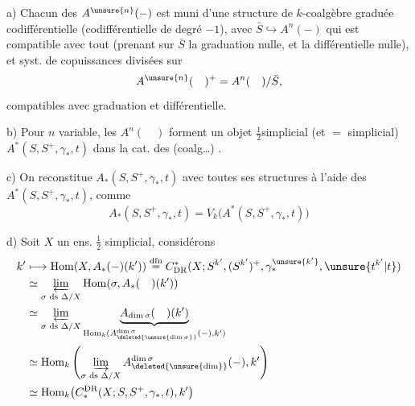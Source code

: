 a) Chacun des $A^{\unsure{n}}(-)$ est muni d'une structure de $k$-coalgèbre  graduée codifférentielle (codifférentielle de degré $-1$), avec  $\bar S\hookrightarrow A^n(-)$ qui est compatible avec tout (prenant sur $\bar S$ la graduation nulle, et la différentielle nulle), et  syst. de copuissances divisées sur
\[
 A^{\unsure{n}}(\quad)^+=A^n(\quad)/\bar S,
\]
compatibles avec graduation et différentielle.

b) Pour $n$ variable, les $A^n(\quad)$ forment un objet $\frac12$simplicial (et $=$ simplicial) $A^*(S,S^+,\gamma_*,t)$ dans la cat. des  (coalg\ldots) .

c) On reconstitue $A_*(S,S^+,\gamma_*,t)$  avec toutes ses structures à l'aide des $A^*(S,S^+,\gamma_*,t)$, comme
\[
 A_*(S,S^+,\gamma_*,t)=V_k\bigl(A^*(S,S^+,\gamma_*,t)\bigr)
\]

d) Soit $X$ un ens. $\frac12$ simplicial, considérons
\[
\begin{aligned}
 k'&\longmapsto\operatorname{Hom}(X,A_*(-)(k'))
 \overset{\mathrm{dfn}}=C^*_{\mathrm{DR}}(X;S^{k'},(S^{k'})^+,\gamma_*^{\unsure{k'}},\unsure{t^{k'}|t})\\
 &\simeq\varprojlim_{\sigma\text{ ds }\Delta/X}\operatorname{Hom}(\sigma,A_*(\quad)(k'))\\
 &\simeq\varprojlim_{\sigma\text{ ds }\Delta/X}\underbrace{A_{\dim\sigma}(\quad)(k')}_{\operatorname{Hom}_k(A^{\dim\sigma}_{\deleted{\unsure{\dim\sigma}}}(-),k')}\\
 &\simeq\operatorname{Hom}_k\left(\varinjlim_{\sigma\text{ ds }\Delta/X} A^{\dim\sigma}_{\deleted{\unsure{\dim}}}(-),k'\right)\\
 &\simeq\operatorname{Hom}_k\bigl(C_*^{\mathrm{DR}}(X;S,S^+,\gamma_*,t),k'\bigr)
\end{aligned}
\]
